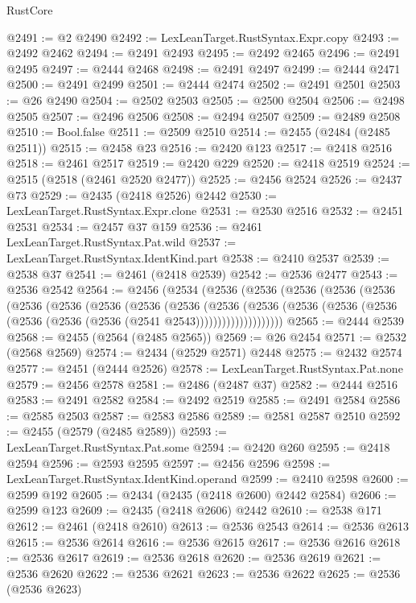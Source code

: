 \begin{lexlean}{RustCore}
\begin{coremodule}
@2491 := @2 @2490
@2492 := LexLeanTarget.RustSyntax.Expr.copy
@2493 := @2492 @2462
@2494 := @2491 @2493
@2495 := @2492 @2465
@2496 := @2491 @2495
@2497 := @2444 @2468
@2498 := @2491 @2497
@2499 := @2444 @2471
@2500 := @2491 @2499
@2501 := @2444 @2474
@2502 := @2491 @2501
@2503 := @26 @2490
@2504 := @2502 @2503
@2505 := @2500 @2504
@2506 := @2498 @2505
@2507 := @2496 @2506
@2508 := @2494 @2507
@2509 := @2489 @2508
@2510 := Bool.false
@2511 := @2509 @2510
@2514 := @2455 (@2484 (@2485 @2511))
@2515 := @2458 @23
@2516 := @2420 @123
@2517 := @2418 @2516
@2518 := @2461 @2517
@2519 := @2420 @229
@2520 := @2418 @2519
@2524 := @2515 (@2518 (@2461 @2520 @2477))
@2525 := @2456 @2524
@2526 := @2437 @73
@2529 := @2435 (@2418 @2526) @2442
@2530 := LexLeanTarget.RustSyntax.Expr.clone
@2531 := @2530 @2516
@2532 := @2451 @2531
@2534 := @2457 @37 @159
@2536 := @2461 LexLeanTarget.RustSyntax.Pat.wild
@2537 := LexLeanTarget.RustSyntax.IdentKind.part
@2538 := @2410 @2537
@2539 := @2538 @37
@2541 := @2461 (@2418 @2539)
@2542 := @2536 @2477
@2543 := @2536 @2542
@2564 := @2456
    (@2534
      (@2536
        (@2536
          (@2536
            (@2536
              (@2536
                (@2536
                  (@2536
                    (@2536
                      (@2536
                        (@2536
                          (@2536
                            (@2536
                              (@2536
                                (@2536 (@2536 (@2536 (@2536 (@2536 (@2541 @2543))))))))))))))))))))
@2565 := @2444 @2539
@2568 := @2455 (@2564 (@2485 @2565))
@2569 := @26 @2454
@2571 := @2532 (@2568 @2569)
@2574 := @2434 (@2529 @2571) @2448
@2575 := @2432 @2574
@2577 := @2451 (@2444 @2526)
@2578 := LexLeanTarget.RustSyntax.Pat.none
@2579 := @2456 @2578
@2581 := @2486 (@2487 @37)
@2582 := @2444 @2516
@2583 := @2491 @2582
@2584 := @2492 @2519
@2585 := @2491 @2584
@2586 := @2585 @2503
@2587 := @2583 @2586
@2589 := @2581 @2587 @2510
@2592 := @2455 (@2579 (@2485 @2589))
@2593 := LexLeanTarget.RustSyntax.Pat.some
@2594 := @2420 @260
@2595 := @2418 @2594
@2596 := @2593 @2595
@2597 := @2456 @2596
@2598 := LexLeanTarget.RustSyntax.IdentKind.operand
@2599 := @2410 @2598
@2600 := @2599 @192
@2605 := @2434 (@2435 (@2418 @2600) @2442 @2584)
@2606 := @2599 @123
@2609 := @2435 (@2418 @2606) @2442
@2610 := @2538 @171
@2612 := @2461 (@2418 @2610)
@2613 := @2536 @2543
@2614 := @2536 @2613
@2615 := @2536 @2614
@2616 := @2536 @2615
@2617 := @2536 @2616
@2618 := @2536 @2617
@2619 := @2536 @2618
@2620 := @2536 @2619
@2621 := @2536 @2620
@2622 := @2536 @2621
@2623 := @2536 @2622
@2625 := @2536 (@2536 @2623)

\end{coremodule}
\end{lexlean}
